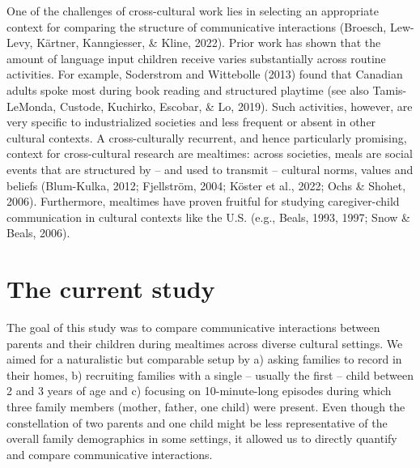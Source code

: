 \documentclass[
  man,floatsintext]{apa6}
\begin{document}
One of the challenges of cross-cultural work lies in selecting an appropriate context for comparing the structure of communicative interactions (Broesch, Lew-Levy, Kärtner, Kanngiesser, \& Kline, 2022). Prior work has shown that the amount of language input children receive varies substantially across routine activities. For example, Soderstrom and Wittebolle (2013) found that Canadian adults spoke most during book reading and structured playtime (see also Tamis-LeMonda, Custode, Kuchirko, Escobar, \& Lo, 2019). Such activities, however, are very specific to industrialized societies and less frequent or absent in other cultural contexts. A cross-culturally recurrent, and hence particularly promising, context for cross-cultural research are mealtimes: across societies, meals are social events that are structured by -- and used to transmit -- cultural norms, values and beliefs (Blum-Kulka, 2012; Fjellström, 2004; Köster et al., 2022; Ochs \& Shohet, 2006). Furthermore, mealtimes have proven fruitful for studying caregiver-child communication in cultural contexts like the U.S. (e.g., Beals, 1993, 1997; Snow \& Beals, 2006).

\hypertarget{the-current-study}{%
\section{The current study}\label{the-current-study}}

The goal of this study was to compare communicative interactions between parents and their children during mealtimes across diverse cultural settings. We aimed for a naturalistic but comparable setup by a) asking families to record in their homes, b) recruiting families with a single -- usually the first -- child between 2 and 3 years of age and c) focusing on 10-minute-long episodes during which three family members (mother, father, one child) were present. Even though the constellation of two parents and one child might be less representative of the overall family demographics in some settings, it allowed us to directly quantify and compare communicative interactions.
\end{document}
